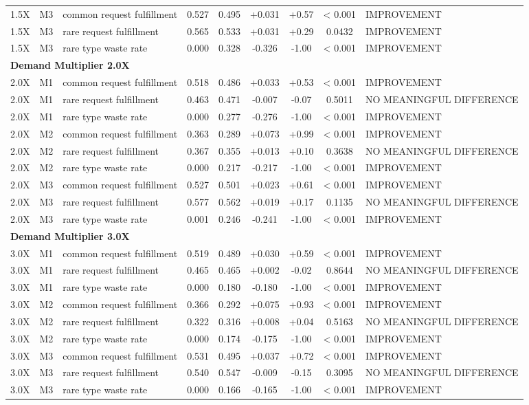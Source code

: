 \begin{table}[t]
\begin{tabular}{lllcccccl}
1.5X & M3 & common request fulfillment & 0.527 & 0.495 & +0.031 & +0.57 & < 0.001 & IMPROVEMENT \\
1.5X & M3 & rare request fulfillment & 0.565 & 0.533 & +0.031 & +0.29 & 0.0432 & IMPROVEMENT \\
1.5X & M3 & rare type waste rate & 0.000 & 0.328 & -0.326 & -1.00 & < 0.001 & IMPROVEMENT \\
\midrule
\multicolumn{9}{l}{\textbf{Demand Multiplier 2.0X}} \\
\midrule
2.0X & M1 & common request fulfillment & 0.518 & 0.486 & +0.033 & +0.53 & < 0.001 & IMPROVEMENT \\
2.0X & M1 & rare request fulfillment & 0.463 & 0.471 & -0.007 & -0.07 & 0.5011 & NO MEANINGFUL DIFFERENCE \\
2.0X & M1 & rare type waste rate & 0.000 & 0.277 & -0.276 & -1.00 & < 0.001 & IMPROVEMENT \\
2.0X & M2 & common request fulfillment & 0.363 & 0.289 & +0.073 & +0.99 & < 0.001 & IMPROVEMENT \\
2.0X & M2 & rare request fulfillment & 0.367 & 0.355 & +0.013 & +0.10 & 0.3638 & NO MEANINGFUL DIFFERENCE \\
2.0X & M2 & rare type waste rate & 0.000 & 0.217 & -0.217 & -1.00 & < 0.001 & IMPROVEMENT \\
2.0X & M3 & common request fulfillment & 0.527 & 0.501 & +0.023 & +0.61 & < 0.001 & IMPROVEMENT \\
2.0X & M3 & rare request fulfillment & 0.577 & 0.562 & +0.019 & +0.17 & 0.1135 & NO MEANINGFUL DIFFERENCE \\
2.0X & M3 & rare type waste rate & 0.001 & 0.246 & -0.241 & -1.00 & < 0.001 & IMPROVEMENT \\
\midrule
\multicolumn{9}{l}{\textbf{Demand Multiplier 3.0X}} \\
\midrule
3.0X & M1 & common request fulfillment & 0.519 & 0.489 & +0.030 & +0.59 & < 0.001 & IMPROVEMENT \\
3.0X & M1 & rare request fulfillment & 0.465 & 0.465 & +0.002 & -0.02 & 0.8644 & NO MEANINGFUL DIFFERENCE \\
3.0X & M1 & rare type waste rate & 0.000 & 0.180 & -0.180 & -1.00 & < 0.001 & IMPROVEMENT \\
3.0X & M2 & common request fulfillment & 0.366 & 0.292 & +0.075 & +0.93 & < 0.001 & IMPROVEMENT \\
3.0X & M2 & rare request fulfillment & 0.322 & 0.316 & +0.008 & +0.04 & 0.5163 & NO MEANINGFUL DIFFERENCE \\
3.0X & M2 & rare type waste rate & 0.000 & 0.174 & -0.175 & -1.00 & < 0.001 & IMPROVEMENT \\
3.0X & M3 & common request fulfillment & 0.531 & 0.495 & +0.037 & +0.72 & < 0.001 & IMPROVEMENT \\
3.0X & M3 & rare request fulfillment & 0.540 & 0.547 & -0.009 & -0.15 & 0.3095 & NO MEANINGFUL DIFFERENCE \\
3.0X & M3 & rare type waste rate & 0.000 & 0.166 & -0.165 & -1.00 & < 0.001 & IMPROVEMENT \\
\bottomrule
\end{tabular}
\end{table}
